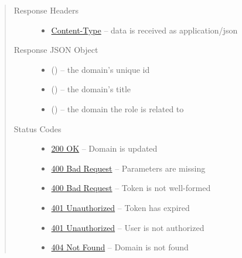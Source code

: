\documentclass[letterpaper,10pt,english]{sphinxmanual}
\begin{document}
\begin{fulllineitems}
\begin{quote}
\begin{description}
\begin{itemize}
\end{itemize}

\item[{Response Headers}] \leavevmode\begin{itemize}
\item {} 
\href{http://tools.ietf.org/html/rfc7231\#section-3.1.1.5}{Content-Type} -- data is received as application/json

\end{itemize}

\item[{Response JSON Object}] \leavevmode\begin{itemize}
\item {} 
 () -- the domain's unique id

\item {} 
 () -- the domain's title

\item {} 
 () -- the domain the role is related to

\end{itemize}

\item[{Status Codes}] \leavevmode\begin{itemize}
\item {} 
\href{http://www.w3.org/Protocols/rfc2616/rfc2616-sec10.html\#sec10.2.1}{200 OK} -- Domain is updated

\item {} 
\href{http://www.w3.org/Protocols/rfc2616/rfc2616-sec10.html\#sec10.4.1}{400 Bad Request} -- Parameters are missing

\item {} 
\href{http://www.w3.org/Protocols/rfc2616/rfc2616-sec10.html\#sec10.4.1}{400 Bad Request} -- Token is not well-formed

\item {} 
\href{http://www.w3.org/Protocols/rfc2616/rfc2616-sec10.html\#sec10.4.2}{401 Unauthorized} -- Token has expired

\item {} 
\href{http://www.w3.org/Protocols/rfc2616/rfc2616-sec10.html\#sec10.4.2}{401 Unauthorized} -- User is not authorized

\item {} 
\href{http://www.w3.org/Protocols/rfc2616/rfc2616-sec10.html\#sec10.4.5}{404 Not Found} -- Domain is not found

\end{itemize}

\end{description}\end{quote}

\end{fulllineitems}
\end{document}
